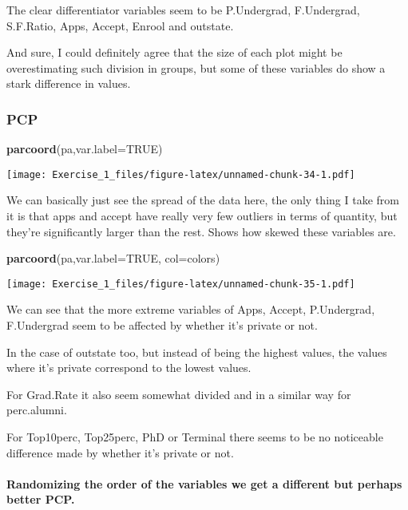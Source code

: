 \documentclass[]{article}
\newenvironment{Shaded}{\begin{snugshade}}{\end{snugshade}}
\newcommand{\DataTypeTok}[1]{\textcolor[rgb]{0.13,0.29,0.53}{#1}}
\newcommand{\KeywordTok}[1]{\textcolor[rgb]{0.13,0.29,0.53}{\textbf{#1}}}
\newcommand{\NormalTok}[1]{#1}
\newcommand{\OtherTok}[1]{\textcolor[rgb]{0.56,0.35,0.01}{#1}}
\let\oldparagraph\paragraph
\renewcommand{\paragraph}[1]{\oldparagraph{#1}\mbox{}}
\begin{document}
The clear differentiator variables seem to be P.Undergrad, F.Undergrad,
S.F.Ratio, Apps, Accept, Enrool and outstate.

And sure, I could definitely agree that the size of each plot might be
overestimating such division in groups, but some of these variables do
show a stark difference in values.

\hypertarget{pcp}{%
\subsubsection{PCP}\label{pcp}}

\begin{Shaded}
\begin{Highlighting}[]
\KeywordTok{parcoord}\NormalTok{(pa,}\DataTypeTok{var.label=}\OtherTok{TRUE}\NormalTok{)}
\end{Highlighting}
\end{Shaded}

\texttt{[image: Exercise\_1\_files/figure-latex/unnamed-chunk-34-1.pdf]}

We can basically just see the spread of the data here, the only thing I
take from it is that apps and accept have really very few outliers in
terms of quantity, but they're significantly larger than the rest. Shows
how skewed these variables are.

\begin{Shaded}
\begin{Highlighting}[]
\KeywordTok{parcoord}\NormalTok{(pa,}\DataTypeTok{var.label=}\OtherTok{TRUE}\NormalTok{, }\DataTypeTok{col=}\NormalTok{colors)}
\end{Highlighting}
\end{Shaded}

\texttt{[image: Exercise\_1\_files/figure-latex/unnamed-chunk-35-1.pdf]}

We can see that the more extreme variables of Apps, Accept, P.Undergrad,
F.Undergrad seem to be affected by whether it's private or not.

In the case of outstate too, but instead of being the highest values,
the values where it's private correspond to the lowest values.

For Grad.Rate it also seem somewhat divided and in a similar way for
perc.alumni.

For Top10perc, Top25perc, PhD or Terminal there seems to be no
noticeable difference made by whether it's private or not.

\hypertarget{randomizing-the-order-of-the-variables-we-get-a-different-but-perhaps-better-pcp.}{%
\paragraph{Randomizing the order of the variables we get a different but
perhaps better
PCP.}\label{randomizing-the-order-of-the-variables-we-get-a-different-but-perhaps-better-pcp.}}
\end{document}
